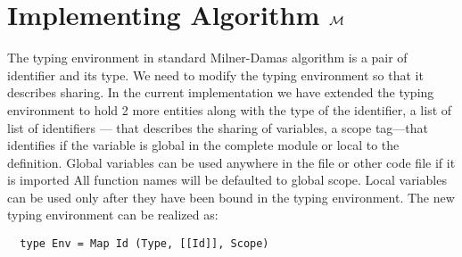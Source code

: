 
\section{Implementing Algorithm $\mathcal{M}$}

The typing environment in standard Milner-Damas algorithm
is a pair of identifier and its type.
We need to modify the typing environment so that it describes sharing.
In the current implementation we have
extended the typing environment to hold 2 more entities along with the
type of the identifier, a list of list of identifiers --- that describes the sharing of variables,
a scope tag---that identifies if the variable is global in the complete module or local to the definition.
Global variables can be used anywhere in the file or other code file if it is imported
All function names will be defaulted to global scope.
Local variables can be used only after they have been bound in the typing environment.
The new typing environment can be realized as:
\begin{verbatim}
  type Env = Map Id (Type, [[Id]], Scope)
\end{verbatim}





